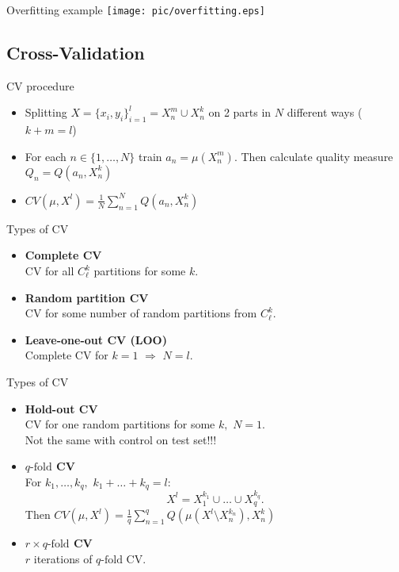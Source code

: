 \documentclass{beamer}
\begin{document}
\begin{frame}{Overfitting example}
    \texttt{[image: pic/overfitting.eps]}
\end{frame}

\subsection{Cross-Validation}
\begin{frame}{CV procedure}
    \begin{itemize}
    \item Splitting $X=\{x_i,y_i\}^l_{i=1} = X_n^m\cup X_n^k$ on 2 parts in $N$ different ways ($k+m = l$)\\
    \bigskip
    \item For each $n\in\{1,\dots,N\}$ train $a_n = \mu(X_n^m).$ Then calculate quality measure $Q_n=Q(a_n,X^k_n)$ \\
    \bigskip
    \item $CV(\mu,X^l)=\frac{1}{N}\sum_{n=1}^N Q(a_n,X^k_n)$
    \end{itemize}
\end{frame}

\begin{frame}{Types of CV}
\begin{itemize}
\item \textbf{Complete CV}\\
CV for all $C_\ell^k$ partitions for some $k.$
\bigskip
\item \textbf{Random partition CV}\\
CV for some number of random partitions from $C_\ell^k.$
\bigskip
\item \textbf{Leave-one-out CV (LOO)}\\
Complete CV for $k=1$ $\Rightarrow$ $N=l$.
\end{itemize}
\end{frame}

\begin{frame}{Types of CV}
\begin{itemize}
\item \textbf{Hold-out CV}\\
CV for one random partitions for some $k,$ $N = 1.$\\
Not the same with control on test set!!!
\bigskip
\item \textbf{$q\text{-fold}$ CV}\\
For $k_1,\dots,k_q,$ $k_1+\dots+k_q = l:$
$$X^l = X_1^{k_1}\cup \dots \cup X_q^{k_q}.$$
Then $CV(\mu,X^l)=\frac{1}{q}\sum_{n=1}^q Q(\mu(X^l \setminus X^{k_n}_n),X^k_n)$
\bigskip
\item \textbf{$r\times q\text{-fold}$ CV}\\
$r$ iterations of $q\text{-fold}$ CV.
\end{itemize}
\end{frame}
\end{document}
